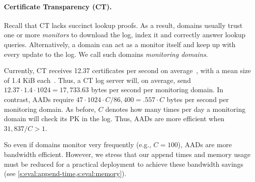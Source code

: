 \paragraph{Certificate Transparency (CT).}
Recall that CT lacks succinct lookup proofs.
As a result, domains usually trust one or more \textit{monitors} to download the log, index it and correctly answer lookup queries.
Alternatively, a domain can act as a monitor itself and keep up with every update to the log.
We call such domains \emph{monitoring domains}.

Currently, CT receives 12.37 certificates per second on average~\cite{ct-num-certs}, with a mean size of 1.4 KiB each~\cite{ct-avg-cert-size}.
Thus, a CT log server will, on average, send $12.37 \cdot 1.4 \cdot 1024 = 17,733.63$ bytes per second per monitoring domain.
In contrast, AADs require $47 \cdot 1024 \cdot C / 86,400 = .557\cdot C$ bytes per second per monitoring domain.
As before, $C$ denotes how many times per day a monitoring domain will check its PK in the log.
Thus, AADs are more efficient when $31,837 / C > 1$.

So even if domains monitor very frequently (e.g., $C = 100$), AADs are more bandwidth efficient.
However, we stress that our append times and memory usage must be reduced for a practical deployment to achieve these bandwidth savings (see \cref{s:eval:append-time,s:eval:memory}).

%



